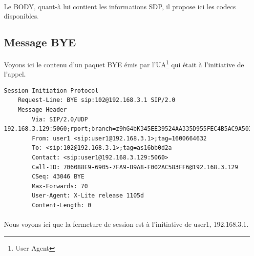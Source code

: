 \documentclass[12pt,a4paper,notitlepage]{article}
\begin{document}
\paragraph{}Le BODY, quant-à lui contient les informations SDP, il propose ici les codecs disponibles. 

\subsection{Message BYE} 
Voyons ici le contenu d'un paquet BYE émis par l'UA\footnote{User Agent} qui était à l'initiative de l'appel.

\begin{lstlisting}[title=Contenu d'un paquet BYE]
Session Initiation Protocol
    Request-Line: BYE sip:102@192.168.3.1 SIP/2.0
    Message Header
        Via: SIP/2.0/UDP 192.168.3.129:5060;rport;branch=z9hG4bK345EE39524AA335D955FEC4B5AC9A503
        From: user1 <sip:user1@192.168.3.1>;tag=1600664632
        To: <sip:102@192.168.3.1>;tag=as16bb0d2a
        Contact: <sip:user1@192.168.3.129:5060>
        Call-ID: 706088E9-6905-7FA9-B9A8-F002AC583FF6@192.168.3.129
        CSeq: 43046 BYE
        Max-Forwards: 70
        User-Agent: X-Lite release 1105d
        Content-Length: 0
\end{lstlisting}
\paragraph{}Nous voyons ici que la fermeture de session est à l'initiative de user1, 192.168.3.1.
\end{document}
